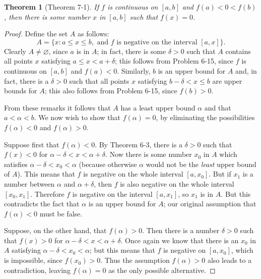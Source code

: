 \documentclass{article}
\newtheorem*{theorem*}{Theorem}
\begin{document}
\begin{theorem*}[Theorem 7-1]
  If $f$ is continuous on $[a, b]$ and $f(a) < 0 < f(b)$, then there is some
  number $x$ in $[a, b]$ such that $f(x) = 0$.
\end{theorem*}

\begin{proof}
  Define the set $A$ as follows: \begin{equation*}
    A = \{x : a \leq x \leq b, \text{ and } f \text{ is negative on the interval
      } [a, x]\}.
  \end{equation*}
  Clearly $A \neq \varnothing$, since $a$ is in $A$; in fact, there is some
  $\delta > 0$ such that $A$ contains all points $x$ satisfying $a \leq x < a +
  \delta$; this follows from Problem 6-15, since $f$ is continuous on $[a, b]$
  and $f(a) < 0$. Similarly, $b$ is an upper bound for $A$ and, in fact, there
  is a $\delta > 0$ such that all points $x$ satisfying $b - \delta < x \leq b$
  are upper bounds for $A$; this also follows from Problem 6-15, since $f(b) >
  0$.

  From these remarks it follows that $A$ has a least upper bound $\alpha$ and
  that $a < \alpha < b$. We now wish to show that $f(\alpha) = 0$, by
  eliminating the possibilities $f(\alpha) < 0$ and $f(\alpha) > 0$.

  Suppose first that $f(\alpha) < 0$. By Theorem 6-3, there is a $\delta > 0$
  such that $f(x) < 0$ for $\alpha - \delta < x < \alpha + \delta$. Now there is
  some number $x_0$ in $A$ which satisfies $\alpha - \delta < x_0 < \alpha$
  (because otherwise $\alpha$ would not be the \emph{least} upper bound of $A$).
  This means that $f$ is negative on the whole interval $[a, x_0]$. But if $x_1$
  is a number between $\alpha$ and $\alpha + \delta$, then $f$ is also negative
  on the whole interval $[x_0, x_1]$. Therefore $f$ is negative on the interval
  $[a, x_1]$, so $x_1$ is in $A$. But this contradicts the fact that $\alpha$ is
  an upper bound for $A$; our original assumption that $f(\alpha) < 0$ must be
  false.

  Suppose, on the other hand, that $f(\alpha) > 0$. Then there is a number
  $\delta > 0$ such that $f(x) > 0$ for $\alpha - \delta < x < \alpha + \delta$.
  Once again we know that there is an $x_0$ in $A$ satisfying $\alpha - \delta <
  x_0 < \alpha$; but this means that $f$ is negative on $[a, x_0]$, which is
  impossible, since $f(x_0) > 0$. Thus the assumption $f(\alpha) > 0$ also leads
  to a contradiction, leaving $f(\alpha) = 0$ as the only possible alternative.
\end{proof}
\end{document}
